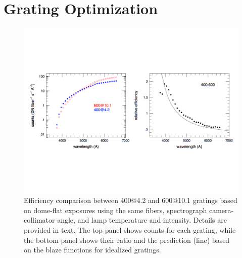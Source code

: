 \chapter{Grating Optimization}
\label{sec:grating}

\begin{figure}[htb]
\centering
\vskip -1.25in
  \includegraphics[width=\textwidth]{Appendix/figs/blaze_comp_land.pdf}
\vskip -1.25in
\caption[NGC 891 observing program grating
optimization]{\label{fig:grating_comp}\fixspacing Efficiency
  comparison between 400@4.2 and 600@10.1 gratings based on dome-flat
  exposures using the same fibers, spectrograph camera-collimator
  angle, and lamp temperature and intensity. Details are provided in
  text. The top panel shows counts for each grating, while the bottom
  panel shows their ratio and the prediction (line) based on the blaze
  functions for idealized gratings.}
\end{figure}




